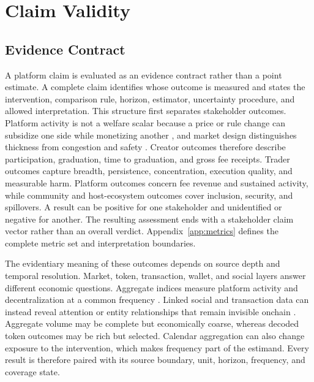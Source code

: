 \documentclass{article}
\begin{document}
\section{Claim Validity}
\label{sec:claim-validity}

\subsection{Evidence Contract}

A platform claim is evaluated as an evidence contract rather than a point estimate. A complete claim identifies whose outcome is measured and states the intervention, comparison rule, horizon, estimator, uncertainty procedure, and allowed interpretation. This structure first separates stakeholder outcomes. Platform activity is not a welfare scalar because a price or rule change can subsidize one side while monetizing another \citep{rochettirole2003}, and market design distinguishes thickness from congestion and safety \citep{roth2008}. Creator outcomes therefore describe participation, graduation, time to graduation, and gross fee receipts. Trader outcomes capture breadth, persistence, concentration, execution quality, and measurable harm. Platform outcomes concern fee revenue and sustained activity, while community and host-ecosystem outcomes cover inclusion, security, and spillovers. A result can be positive for one stakeholder and unidentified or negative for another. The resulting assessment ends with a stakeholder claim vector rather than an overall verdict. Appendix~\ref{app:metrics} defines the complete metric set and interpretation boundaries.

The evidentiary meaning of these outcomes depends on source depth and temporal resolution. Market, token, transaction, wallet, and social layers answer different economic questions. Aggregate indices measure platform activity and decentralization at a common frequency \citep{chemaya2025uniswap}. Linked social and transaction data can instead reveal attention or entity relationships that remain invisible onchain \citep{wang2024exgraph,chen2024finml}. Aggregate volume may be complete but economically coarse, whereas decoded token outcomes may be rich but selected. Calendar aggregation can also change exposure to the intervention, which makes frequency part of the estimand. Every result is therefore paired with its source boundary, unit, horizon, frequency, and coverage state.
\end{document}
